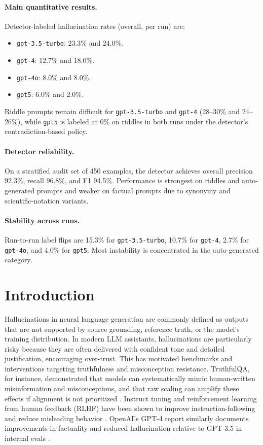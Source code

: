 \documentclass[11pt]{article}
\newcommand{\model}[1]{\texttt{#1}}
\begin{document}
\paragraph{Main quantitative results.}
Detector-labeled hallucination rates (overall, per run) are:
\begin{itemize}[leftmargin=1.4em]
  \item \model{gpt-3.5-turbo}: 23.3\% and 24.0\%.
  \item \model{gpt-4}: 12.7\% and 18.0\%.
  \item \model{gpt-4o}: 8.0\% and 8.0\%.
  \item \model{gpt5}: 6.0\% and 2.0\%.
\end{itemize}
Riddle prompts remain difficult for \model{gpt-3.5-turbo} and \model{gpt-4} (28--30\% and 24--26\%), while \model{gpt5} is labeled at 0\% on riddles in both runs under the detector's contradiction-based policy.

\paragraph{Detector reliability.}
On a stratified audit set of 450 examples, the detector achieves overall precision 92.3\%, recall 96.8\%, and F1 94.5\%. Performance is strongest on riddles and auto-generated prompts and weaker on factual prompts due to synonymy and scientific-notation variants.

\paragraph{Stability across runs.}
Run-to-run label flips are 15.3\% for \model{gpt-3.5-turbo}, 10.7\% for \model{gpt-4}, 2.7\% for \model{gpt-4o}, and 4.0\% for \model{gpt5}. Most instability is concentrated in the auto-generated category.

\section{Introduction}
Hallucinations in neural language generation are commonly defined as outputs that are not supported by source grounding, reference truth, or the model's training distribution. In modern LLM assistants, hallucinations are particularly risky because they are often delivered with confident tone and detailed justification, encouraging over-trust. This has motivated benchmarks and interventions targeting truthfulness and misconception resistance. TruthfulQA, for instance, demonstrated that models can systematically mimic human-written misinformation and misconceptions, and that raw scaling can amplify these effects if alignment is not prioritized \cite{lin2022truthfulqa}. Instruct tuning and reinforcement learning from human feedback (RLHF) have been shown to improve instruction-following and reduce misleading behavior \cite{ouyang2022instruct}. OpenAI's GPT-4 report similarly documents improvements in factuality and reduced hallucination relative to GPT-3.5 in internal evals \cite{openaiGPT4}.
\end{document}
